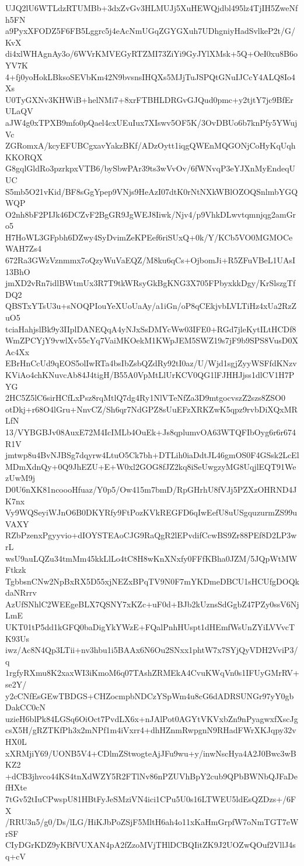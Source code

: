 UJQ2lU6WTLdzRTUMBb+3dxZvGv3HLMUJj5XuHEWQjdbl495lz4TjIH5ZweNfh5FN
a9PyxXFODZ5F6FB5Lggrc5j4eAcNmUGqZGYGXuh7UDhgniyHadSvlkeP2t/G/KvX
di4xlWHAgnAy3o/6WVrKMVEGyRTZMI73ZiYi9GyJYlXMsk+5Q+OeI0xu8B6oYV7K
4+fj0yoHokLBksoSEVbKm42N9bvsnsIHQXs5MJjTuJSPQtGNuIJCcY4ALQ8Io4Xs
U0TyGXNv3KHWiB+helNMi7+8xrFTBHLDRGvGJQud0pmc+y2tjtY7jc9BfErULaQV
aJW4g0xTPXB9mfo0pQael4cxUEuIux7XIswv5OF5K/3OvDBUo6b7knPfy5YWujVc
ZGRomxA/kcyEFUBCgxavYakzBKf/ADzOytt1iqgQWEnMQGONjCoHyKqUqhKKORQX
G8gqlGldRo3pzrkpxVTB6/bySbwPAr39ts3wVvOv/6fWNvqP3eYJXnMyEndeqUUC
S5mb5O21vKid/BF8sGgYpep9VNjs9HeAzI07dtK0rNtNXkWBlOZOQSnlmbYGQWQP
O2nh8bF2PIJk46DCZvF2BgGR9JgWEJ8Iiwk/Njv4/p9VhkDLwvtqmnjqg2amGro5
H7HoWL3GFpbh6DZwy4SyDvimZeKPEef6riSUxQ+0k/Y/KCb5VO0MGMOCeWAH7Zs4
672Ra3GWzVznmmx7oQzyWuVaEQZ/M8ku6qCs+OjbomJi+R5ZFuVBeL1UAsI13BhO
jmXD2vRn7idlBWtmUx3R7T9tkWRsyGkBgKNG3X705FPbyxkkDgy/KrSlszgTfDQ2
QBSTxYTsU3u+sNOQPIouYeXUoUaAy/a1iGn/oP8qCEkjvbLVLTiHz4xUa2RzZuO5
tciaHahjslBk9y3IIplDANEQqA4yNJxSsDMYcWw03IFE0+RGd7jleKytILtHCDf8
WmZPCYjY9vwlXv55cYq7VaiMKOekM1KWpJEM5SWZ19s7jF9b9SPS8VusD0XAc4Xx
EBrHnCcUd9qEOS5olIwRTa4bsIbZsbQZdRy92tI0az/U/Wjd1sgjZyyWSFfdKNzv
KViAo4chKNuvcAb84J4tigH/B55A0VpMtLlUrKCV0QG1lFJHHJjss1dlCV1H7PYG
2HC5Z5lC6sirHCfLxPsz8rqMtlQ7dg4Ry1NlVTeNfZa3D9mtgocvszZ2szs8ZSO0
otDkj+r68O4lGru+NnvCZ/Sh6qr7NdGPZ8sUuEFzXRKZwK5qpz9rvbDiXQxMRLfN
13/VYBGBJv08AuxE72M4IcIMLb4OuEk+Js8qplumvOA63WTQFIbOyg6r6r674R1V
jmtwp8u4BvNJBSg7dqyrw4LtuO5Ck7bh+DTLih0iaDdtJL46gmOS0F4GSsk2LcEl
MDmXdnQy+0Q9JhEZU+E+W0xl2GOG8fJZ2kq8iSeUwgzyMG8UqjlEQT91WezUwM9j
D0U6nXK81ncoooHfuaz/Y0p5/Ow415m7bmD/RpGHrhU8fVJj5PZXzOHRND4JK7nx
Vy9WQSeyiWJnO6B0DKYRfy9FtPozKVkREGFD6qIwEefU8uUSgquzurmZS99uVAXY
RZbPzenxPgyyvio+dIOYSTEAoCJG9RaQgR2lEPvdifCcwBS9Zr88PEf8D2LP3wrL
wsU9auLQZu34tmMm45kkLlLo4tC8H8wKnXNxfy0FFfKBha0JZM/5JQpWtMWFtkzk
TgbbsnCNw2NpBxRX5D55xjNEZxBPqTV9N0F7mYKDmeDBCU1sHCUfgDOQkdaNRrrv
AzUfSNhlC2WEEgeBLX7QSNY7xKZc+uF0d+BJb2kUznsSdGgbZ47PZy0ssV6NjLmE
UKT01tP5dd1kGFQ0baDigYkYWzE+FQalPnhHUspt1dHEmfWsUnZYiLVVvcTK93Us
iwz/Ac8N4Qp3LTii+nv3hbu1i5BAAx6N6Ou2SNxx1phtW7x7SYjQyVDH2VviP3/q
1rgfyRXmu8K2xaxWI3iKmoM6q07TAshZRMEkA4CvuKWqVn0s1IFUyGMrRV+se2Y/
y2cCNfEsGEwTBDGS+CHZocmpbNDCzYSpWm4u8cG6dADRSUNGr97yY0gbDakCC0cN
uzieH6blPk84LGSq6OiOct7PvdLX6x+nJAlPot0AGYtVKVxbZn9nPyagwxfXscJg
csX5H/gRZTKfPh3x2mNPf1m4iVxrr4+dhHZnmRwpgnN9RHadFWrXKJqpy32vHX0L
xXRMjiY69/UONB5V4+CDlmZStwogteAjJFu9wu+y/inwNscHya4A2J0Bwc3wBKZ2
+dCB3jhvco44KS4tnXdWZY5R2FTlNv86nPZUVhBpY2cub9QPbBWNbQJFaDefHXte
7tGv52tIuCPwspU81HBtFyJeSMziVN4ici1CPu5U0s16LTWEU5ldEsQZDzs+/6FX
/RRU3n5/g0/Ds/lLG/HiKJbPoZSjF5MltH6ah4o11xKaHmGrpfW7oNmTGT7eWrSF
CIyDGrKDZ9yKBfVUXAN4pA2fZzoMVjTHlDCBQIitZK9J2UOZwQOuf2VllJ4sq+cV
